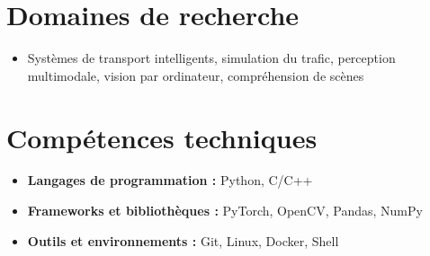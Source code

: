 \documentclass[a4paper,11pt]{article}
\makeatletter
\newcommand{\resumeSubheading}[4]{
\vspace{0.5mm}\item
    \begin{tabular*}{0.98\textwidth}[t]{l@{\extracolsep{\fill}}r}
        \textbf{#1} & \textit{\footnotesize{#4}} \\
        \textit{\footnotesize{#3}} &  \footnotesize{#2}\\
    \end{tabular*}
    \vspace{-2.4mm}
}
\newcommand{\resumeItemListStart}{\begin{justify}\begin{itemize}[leftmargin=3ex, rightmargin=2ex, noitemsep,labelsep=1.2mm,itemsep=0mm]\small}
\newcommand{\resumeSubHeadingListEnd}{\end{itemize}\vspace{0.5mm}}
\newcommand{\resumeItemListEnd}{\end{itemize}\end{justify}\vspace{-4mm}}
\makeatother
\begin{document}


\section{\textbf{Domaines de recherche}}
\begin{itemize}[leftmargin=0.15in, itemsep=2pt]
    \item Systèmes de transport intelligents, simulation du trafic, perception multimodale, vision par ordinateur, compréhension de scènes
\end{itemize}

\section{\textbf{Compétences techniques}}
\begin{itemize}[leftmargin=0.15in, itemsep=2pt]
    \item \textbf{Langages de programmation :} Python, C/C++
    \item \textbf{Frameworks et bibliothèques :} PyTorch, OpenCV, Pandas, NumPy
    \item \textbf{Outils et environnements :} Git, Linux, Docker, Shell 
\end{itemize}

\end{document}
